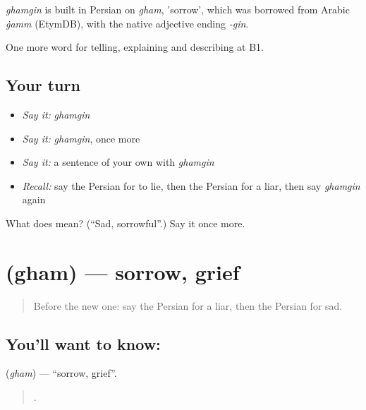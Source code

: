 \begin{cousinweb}
\emph{ghamgin} is built in Persian on \emph{gham}, 'sorrow', which was borrowed from Arabic \emph{ġamm} (EtymDB), with the native adjective ending \emph{-gin}.
\end{cousinweb}

\begin{grammarlens}[title={What you've built}]
One more word for telling, explaining and describing at B1.
\end{grammarlens}

\subsection*{Your turn}
\begin{itemize}
\raggedright
  \item \emph{Say it:} \emph{ghamgin}
  \item \emph{Say it:} \emph{ghamgin}, once more
  \item \emph{Say it:} a sentence of your own with \emph{ghamgin}
  \item \emph{Recall:} say the Persian for to lie, then the Persian for a liar, then say \emph{ghamgin} again
\end{itemize}

\begin{tcolorbox}[breakable,colback=teal!4,colframe=teal!35!black,title={Before you move on}]
What does  mean? (\textquotedblleft{}Sad, sorrowful\textquotedblright{}.) Say it once more.
\end{tcolorbox}
\section[\texorpdfstring{\fa{غم} (gham)}{غم (gham)}]{ (gham) — sorrow, grief}

\label{lesson:FA-C484-gham}



\begin{quote}
Before the new one: say the Persian for a liar, then the Persian for sad.
\end{quote}

\subsection*{You'll want to know: }
\textbf{} (\emph{gham}) — \textquotedblleft{}sorrow, grief\textquotedblright{}.

\begin{quote}
     .
\end{quote}

